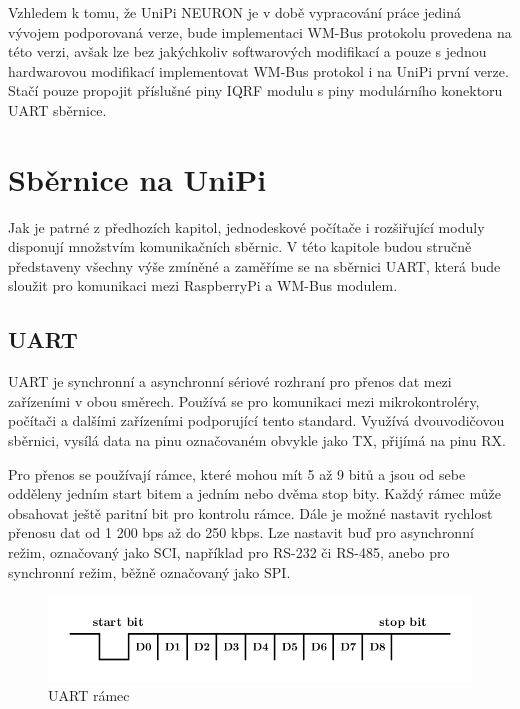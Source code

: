 Vzhledem k tomu, že UniPi NEURON je v době vypracování práce jediná vývojem podporovaná verze, bude implementaci WM-Bus protokolu provedena na této verzi, avšak lze bez jakýchkoliv softwarových modifikací a pouze s jednou hardwarovou modifikací implementovat WM-Bus protokol i na UniPi první verze. Stačí pouze propojit příslušné piny IQRF modulu s piny modulárního konektoru UART sběrnice.



\section{Sběrnice na UniPi}
Jak je patrné z předhozích kapitol, jednodeskové počítače i rozšiřující moduly disponují množstvím komunikačních sběrnic. V této kapitole budou stručně představeny všechny výše zmíněné a zaměříme se na sběrnici UART, která bude sloužit pro komunikaci mezi RaspberryPi a WM-Bus modulem.

\subsection{UART}
UART je synchronní a asynchronní sériové rozhraní pro přenos dat mezi zařízeními v obou směrech. Používá se pro komunikaci mezi mikrokontroléry, počítači a dalšími zařízeními podporující tento standard. Využívá dvouvodičovou sběrnici, vysílá data na pinu označovaném obvykle jako TX, přijímá na pinu RX.

Pro přenos se používají rámce, které mohou mít 5 až 9 bitů a jsou od sebe odděleny jedním start bitem a jedním nebo dvěma stop bity. Každý rámec může obsahovat ještě paritní bit pro kontrolu rámce. Dále je možné nastavit rychlost přenosu dat od 1 200 bps až do 250 kbps. Lze nastavit buď pro asynchronní režim, označovaný jako SCI, například pro RS-232 či RS-485, anebo pro synchronní režim, běžně označovaný jako SPI.

 \begin{figure}[!ht]
  \begin{center}
    \includegraphics[scale=1.0]{obrazky/sbernice_uart}
  \end{center}
  \caption{UART rámec}
\end{figure}

